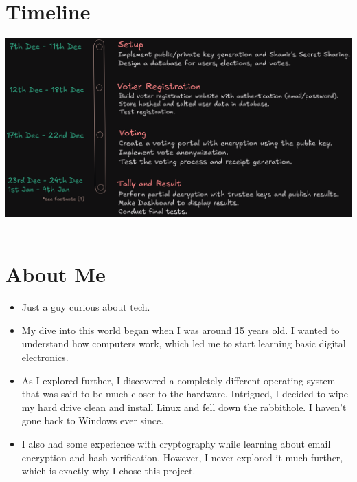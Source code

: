 \documentclass{article}
\begin{document}
\section*{\centering Timeline}
\includegraphics[width=\textwidth]{timeline.png}
\\
\\
\section*{\centering About Me}
\begin{itemize}
\setlength{\itemsep}{1pt} %
  \setlength{\parskip}{0pt}
  \renewcommand{\labelitemi}{\hspace*{-1em}} %
   \item Just a guy curious about tech.
   \\
\item My dive into this world began when I was around 15 years old. I wanted to understand how computers work, which led me to start learning basic digital electronics.
\\
\item As I explored further, I discovered a completely different operating system that was said to be much closer to the hardware. Intrigued, I decided to wipe my hard drive clean and install Linux and fell down the rabbithole. I haven’t gone back to Windows ever since.
\\
\item I also had some experience with cryptography while learning about email encryption and hash verification. However, I never explored it much further, which is exactly why I chose this project.
\end{itemize}
\end{document}
